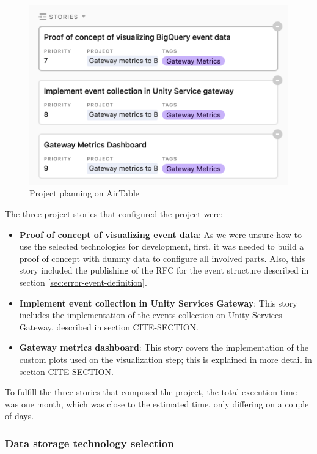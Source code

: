 \documentclass[english, 12pt, a4paper, sci, utf8, a-1b, online]{aaltothesis}
\begin{document}
\begin{figure}[h!]
    \centering
    \includegraphics[scale=0.3]{src/thesis/img/technical-solution/project-planning.png}
    \caption{Project planning on AirTable}
\end{figure}

The three project stories that configured the project were:

\begin{itemize}
    \item \textbf{Proof of concept of visualizing event data}: As we were unsure how to use the selected technologies for development, first, it was needed to build a proof of concept with dummy data to configure all involved parts. Also, this story included the publishing of the RFC for the event structure described in section \ref{sec:error-event-definition}.
    \item \textbf{Implement event collection in Unity Services Gateway}: This story includes the implementation of the events collection on Unity Services Gateway, described in section CITE-SECTION.
    \item \textbf{Gateway metrics dashboard}: This story covers the implementation of the custom plots used on the visualization step; this is explained in more detail in section CITE-SECTION.
\end{itemize}

To fulfill the three stories that composed the project, the total execution time was one month, which was close to the estimated time, only differing on a couple of days.

\subsubsection{Data storage technology selection}
\end{document}
